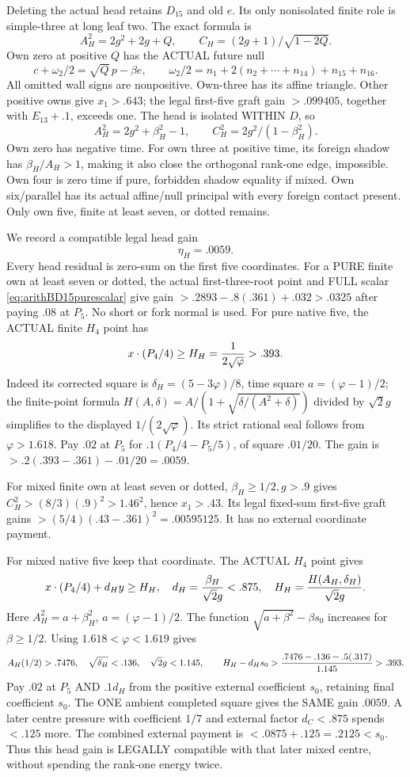 Deleting the actual head retains \(D_{15}\)
and old \(e\).
Its only nonisolated finite role is
simple-three at long leaf two.
The exact formula is
\[
 A_H^2=2g^2+2g+Q,\qquad
                      C_H=(2g+1)/\sqrt{1-2Q}.
\]
Own zero at positive \(Q\) has the
ACTUAL future null
\[
 c+\omega_2/2=\sqrt Q\,p-\beta e,\qquad
 \omega_2/2=n_1+2(n_2+\cdots+n_{14})+n_{15}+n_{16}.
\]
All omitted wall signs are nonpositive.
Own-three has its affine triangle.
Other positive owns give \(x_1>.643\);
the legal first-five graft gain \(>.099405\),
together with \(E_{13}+.1\), exceeds one.
The head is isolated WITHIN \(D\), so
\[
 A_H^2=2g^2+\beta_H^2-1,\qquad
                         C_H^2=2g^2/(1-\beta_H^2).
\]
Own zero has negative time.
For own three at positive time, its
foreign shadow has \(\beta_H/A_H>1\),
making it also close the orthogonal
rank-one edge, impossible.
Own four is zero time if pure, forbidden
shadow equality if mixed.
Own six/parallel has its actual affine/null
principal with every foreign contact present.
Only own five, finite at least seven,
or dotted remains.

We record a compatible legal head gain
\[
                                  \eta_H=.0059 .
\tag{D16OH}\label{eq:arithD16ordinaryheadgain}
\]
Every head residual is zero-sum on the
first five coordinates.
For a PURE finite own at least seven
or dotted, the actual first-three-root
point and FULL scalar
\eqref{eq:arithBD15purescalar} give gain
\(>.2893-.8(.361)+.032>.0325\)
after paying \(.08\) at \(P_5\).
No short or fork normal is used.
For pure native five, the ACTUAL finite
\(H_4\) point has
\[
 x\cdot(P_4/4)\ge H_H={1\over2\sqrt\varphi}>.393 .
\]
Indeed its corrected square is
\(\delta_H=(5-3\varphi)/8\),
time square \(a=(\varphi-1)/2\);
the finite-point formula
\(H(A,\delta)=A/(1+\sqrt{\delta/(A^2+\delta)})\)
divided by \(\sqrt2g\) simplifies to
the displayed \(1/(2\sqrt\varphi)\).
Its strict rational seal follows from
\(\varphi>1.618\).
Pay \(.02\) at \(P_5\) for
\(.1(P_4/4-P_5/5)\), of square \(.01/20\).
The gain is \(>.2(.393-.361)-.01/20=.0059\).

For mixed finite own at least seven
or dotted, \(\beta_H\ge1/2,g>.9\)
gives \(C_H^2>(8/3)(.9)^2>1.46^2\),
hence \(x_1>.43\).
Its legal fixed-sum first-five graft
gains \(>(5/4)(.43-.361)^2=.00595125\).
It has no external coordinate payment.

For mixed native five keep that coordinate.
The ACTUAL \(H_4\) point gives
\[
 x\cdot(P_4/4)+d_Hy\ge H_H,\quad
 d_H={\beta_H\over\sqrt2g}<.875,\quad
 H_H={H(A_H,\delta_H)\over\sqrt2g}.
\]
Here \(A_H^2=a+\beta_H^2\),
\(a=(\varphi-1)/2\).
The function
\(\sqrt{a+\beta^2}-\beta s_0\)
increases for \(\beta\ge1/2\).
Using \(1.618<\varphi<1.619\) gives
\[
 A_H(1/2)>.7476,\quad\sqrt{\delta_H}<.136,\quad
 \sqrt2g<1.145,\qquad
 H_H-d_Hs_0>{.7476-.136-.5(.317)\over1.145}>.393 .
\]
Pay \(.02\) at \(P_5\) AND \(.1d_H\)
from the positive external coefficient
\(s_0\), retaining final coefficient \(s_0\).
The ONE ambient completed square gives
the SAME gain \(.0059\).
A later centre pressure with coefficient
\(1/7\) and external factor \(d_C<.875\)
spends \(<.125\) more.
The combined external payment is
\(<.0875+.125=.2125<s_0\).
Thus this head gain is LEGALLY compatible
with that later mixed centre, without
spending the rank-one energy twice.

